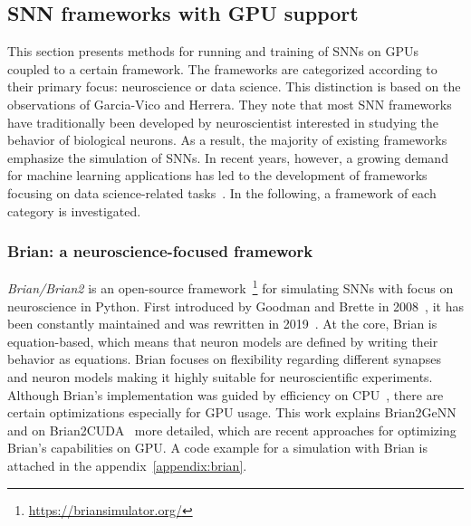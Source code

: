 \subsection{\ac{SNN} frameworks with \ac{GPU} support}
This section presents methods for running and training of \acp{SNN} on \acp{GPU} coupled to a certain framework.
The frameworks are categorized according to their primary focus: neuroscience or data science.  
This distinction is based on the observations of Garcia-Vico and Herrera.  
They note that most \ac{SNN} frameworks have traditionally been developed by neuroscientist interested in studying the behavior of biological neurons.  
As a result, the majority of existing frameworks emphasize the simulation of \acp{SNN}.  
In recent years, however, a growing demand for machine learning applications has led to the development of frameworks focusing on data science-related tasks~\cite{garcia-vico_preliminary_2021}.
In the following, a framework of each category is investigated.

\subsubsection{Brian: a neuroscience-focused framework} \label{sec:brian}
\textit{Brian/Brian2} is an open-source framework~\footnote{\url{https://briansimulator.org/}} for simulating \acp{SNN} with focus on neuroscience in Python.
First introduced by Goodman and Brette in 2008~\cite{goodman_brian_2008}, it has been constantly maintained and was rewritten in 2019~\cite{stimberg_brian_2019}.
At the core, Brian is equation-based, which means that neuron models are defined by writing their behavior as equations.
Brian focuses on flexibility regarding different synapses and neuron models making it highly suitable for neuroscientific experiments.
Although Brian's implementation was guided by efficiency on \ac{CPU}~\cite{stimberg_brian_2019}, there are certain optimizations especially for \ac{GPU} usage.
This work explains Brian2GeNN~\cite{stimberg_brian2genn_2020} and on Brian2CUDA~\cite{alevi_brian2cuda_2022} more detailed, which are recent approaches for optimizing Brian's capabilities on \ac{GPU}.
A code example for a simulation with Brian is attached in the appendix~\ref{appendix:brian}.

